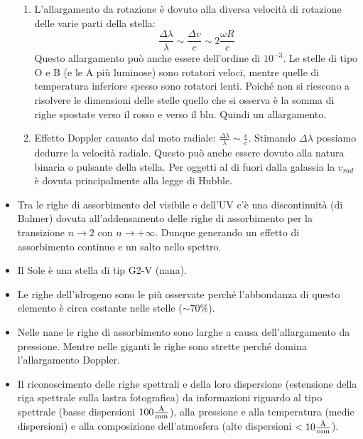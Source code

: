 \documentclass[11pt,a4paper]{article}
\begin{document}
\begin{itemize}
\begin{enumerate}
\item L'allargamento da rotazione è dovuto alla diversa velocità di rotazione delle varie parti della stella:
\begin{equation}
\frac{\Delta \lambda}{\lambda} \sim \frac{\Delta v}{c} \sim 2 \frac{\omega R}{c}
\end{equation}
Questo allargamento può anche essere dell'ordine di $10^{-3}$.
Le stelle di tipo O e B (e le A più luminose) sono rotatori veloci, mentre quelle di temperatura inferiore spesso sono rotatori lenti. Poiché non si riescono a risolvere le dimensioni delle stelle quello che si osserva è la somma di righe spostate verso il rosso e verso il blu. Quindi un allargamento.

\item Effetto Doppler causato dal moto radiale: $\frac{\Delta \lambda}{\lambda} \sim \frac{v}{c}$. Stimando $\Delta \lambda$ possiamo dedurre la velocità radiale. Questo può anche essere dovuto alla natura binaria o pulsante della stella.
Per oggetti al di fuori dalla galassia la $v_{rad}$ è dovuta principalmente alla legge di Hubble.
\end{enumerate}

\item Tra le righe di assorbimento del visibile e dell'UV c'è una discontinuità (di Balmer) dovuta all'addensamento delle righe di assorbimento per la transizione $n \rightarrow 2$ con $n \rightarrow +\infty$. Dunque generando un effetto di assorbimento continuo e un salto nello spettro.

\item Il Sole è una stella di tip G2-V (nana).

\item Le righe dell'idrogeno sono le più osservate perché l'abbondanza di questo elemento è circa costante nelle stelle ($\sim 70\%$).

\item Nelle nane le righe di assorbimento sono larghe a causa dell'allargamento da pressione. Mentre nelle giganti le righe sono strette perché domina l'allargamento Doppler.

\item Il riconoscimento delle righe spettrali e della loro dispersione (estensione della riga spettrale sulla lastra fotografica) da informazioni riguardo al tipo spettrale (basse dispersioni $100 \si{\frac{\angstrom}{\milli \meter}}$), alla pressione e alla temperatura (medie dispersioni) e alla composizione dell'atmosfera (alte dispersioni $< 10 \si{\frac{\angstrom}{\milli \meter}}$).

\end{itemize}
\end{document}

